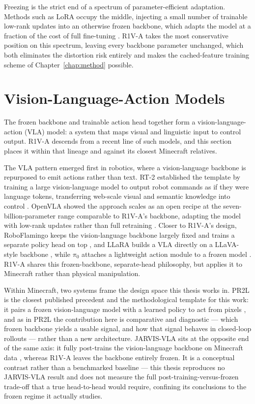 Freezing is the strict end of a spectrum of parameter-efficient adaptation.
Methods such as LoRA occupy the middle, injecting a small number of trainable
low-rank updates into an otherwise frozen backbone, which adapts the model at
a fraction of the cost of full fine-tuning \cite{hu2022lora}. R1V-A takes the
most conservative position on this spectrum, leaving every backbone parameter
unchanged, which both eliminates the distortion risk entirely and makes the
cached-feature training scheme of Chapter~\ref{chap:method} possible.


\section{Vision-Language-Action Models}
\label{sec:bg-vla}
The frozen backbone and trainable action head together form a
vision-language-action (VLA) model: a system that maps visual and
linguistic input to control output. R1V-A descends from a recent line of
such models, and this section places it within that lineage and against its
closest Minecraft relatives.

The VLA pattern emerged first in robotics, where a vision-language backbone
is repurposed to emit actions rather than text. RT-2 established the
template by training a large vision-language model to output robot commands
as if they were language tokens, transferring web-scale visual and semantic
knowledge into control \cite{brohan2023rt2}. OpenVLA showed the approach
scales as an open recipe at the seven-billion-parameter range comparable to
R1V-A's backbone, adapting the model with low-rank updates rather than full
retraining \cite{kim2024openvla}. Closer to R1V-A's design, RoboFlamingo
keeps the vision-language backbone largely fixed and trains a separate
policy head on top \cite{li2023roboflamingo}, and LLaRA builds a VLA
directly on a LLaVA-style backbone \cite{li2024llara}, while $\pi_0$
attaches a lightweight action module to a frozen model \cite{black2024pi0}.
R1V-A shares this frozen-backbone, separate-head philosophy, but applies it
to Minecraft rather than physical manipulation.

Within Minecraft, two systems frame the design space this thesis works in. PR2L
is the closest published precedent and the methodological template for this
work: it pairs a frozen vision-language model with a learned policy to act from
pixels \cite{chen2024pr2l}, and as in PR2L the contribution here is comparative
and diagnostic --- which frozen backbone yields a usable signal, and how that
signal behaves in closed-loop rollouts --- rather than a new architecture.
JARVIS-VLA sits at the opposite end of the same axis: it fully post-trains the
vision-language backbone on Minecraft data \cite{li2025jarvisvla}, whereas R1V-A
leaves the backbone entirely frozen. It is a conceptual contrast rather than a
benchmarked baseline --- this thesis reproduces no JARVIS-VLA result and does not
measure the full post-training-versus-frozen trade-off that a true head-to-head
would require, confining its conclusions to the frozen regime it actually
studies.

